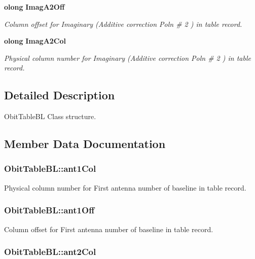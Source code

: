 \begin{CompactItemize}
{\bf olong} {\bf Imag\-A2Off}
\begin{CompactList}\small\item\em Column offset for Imaginary (Additive correction Poln \# 2 ) in table record. \item\end{CompactList}\item 
{\bf olong} {\bf Imag\-A2Col}
\begin{CompactList}\small\item\em Physical column number for Imaginary (Additive correction Poln \# 2 ) in table record. \item\end{CompactList}\end{CompactItemize}


\subsection{Detailed Description}
Obit\-Table\-BL Class structure. 



\subsection{Member Data Documentation}
\subsubsection{ {\bf Obit\-Table\-BL::ant1Col}}\label{structObitTableBL_o25}


Physical column number for First antenna number of baseline in table record. 

\subsubsection{ {\bf Obit\-Table\-BL::ant1Off}}\label{structObitTableBL_o24}


Column offset for First antenna number of baseline in table record. 

\subsubsection{ {\bf Obit\-Table\-BL::ant2Col}}\label{structObitTableBL_o27}


